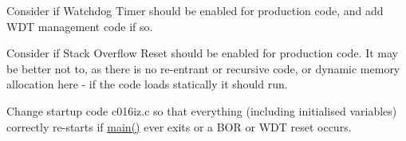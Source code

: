 
\begin{DoxyRefList}
\item[\label{todo__todo000001}%
\hypertarget{todo__todo000001}{}%
File \hyperlink{_config_regs18f4520_8h}{Config\+Regs18f4520.h} ]Consider if Watchdog Timer should be enabled for production code, and add W\+D\+T management code if so.

Consider if Stack Overflow Reset should be enabled for production code. It may be better not to, as there is no re-\/entrant or recursive code, or dynamic memory allocation here -\/ if the code loads statically it should run.

Change startup code c016iz.\+c so that everything (including initialised variables) correctly re-\/starts if \hyperlink{newmain_8c_acdef7a1fd863a6d3770c1268cb06add3}{main()} ever exits or a B\+O\+R or W\+D\+T reset occurs. 
\end{DoxyRefList}